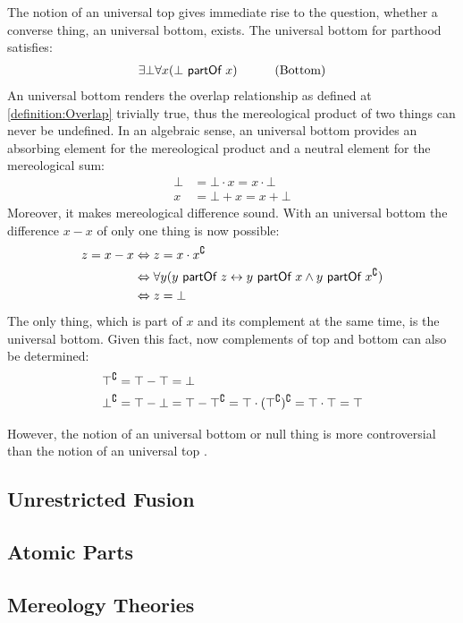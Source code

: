 The notion of an universal top gives immediate rise to the question, whether a converse thing, an universal bottom, exists.
The universal bottom for parthood satisfies:
\begin{align}
&\exists \bot \forall x (\bot ~\textsf{partOf}~ x)
&\qquad \text{(Bottom)}
\end{align}
An universal bottom renders the overlap relationship as defined at \ref{definition:Overlap} trivially true, thus the mereological product of two things can never be undefined.
In an algebraic sense, an universal bottom provides an absorbing element for the mereological product and a neutral element for the mereological sum:
\begin{align}
\bot &= \bot \cdot x = x \cdot \bot
\\
x &= \bot + x = x + \bot
\end{align}
Moreover, it makes mereological difference sound.
With an universal bottom the difference $x - x$ of only one thing is now possible:
\begin{align}
\begin{split}
z = x - x
&\Leftrightarrow
z = x \cdot x^{\complement}
\\&\Leftrightarrow
\forall y (y ~\textsf{partOf}~ z \leftrightarrow y ~\textsf{partOf}~ x \wedge y ~\textsf{partOf}~ x^{\complement})
\\&\Leftrightarrow
z = \bot
\end{split}
\end{align}
The only thing, which is part of $x$ and its complement at the same time, is the universal bottom.
Given this fact, now complements of top and bottom can also be determined:
\begin{align}
\top^{\complement}
&= \top - \top 
= \bot
\\
\bot^{\complement}
&= \top - \bot 
= \top - \top^{\complement} 
= \top \cdot (\top^{\complement})^{\complement}
= \top \cdot \top
= \top
\end{align}

However, the notion of an universal bottom or null thing is more controversial than the notion of an universal top \cite{DBLP:journals/dke/Varzi96}.


\subsection{Unrestricted Fusion}
\label{subsection:UnrestrictedFusion}

\subsection{Atomic Parts}
\label{subsection:AtomicParts}

\subsection{Mereology Theories}
\label{subsection:MereologyTheories}